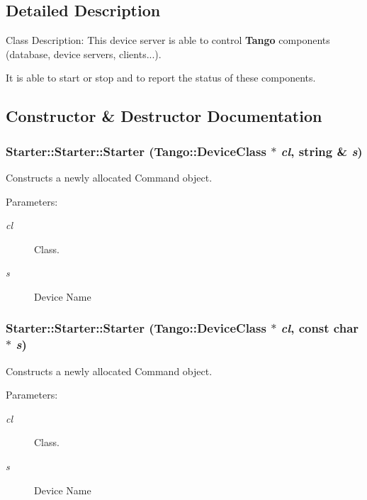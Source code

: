 \subsection{Detailed Description}
Class Description: This device server is able to control {\bf Tango} components (database, device servers, clients...).

It is able to start or stop and to report the status of these components. 



\subsection{Constructor \& Destructor Documentation}
\subsubsection{\setlength{\rightskip}{0pt plus 5cm}Starter::Starter::Starter (Tango::Device\-Class $\ast$ {\em cl}, string \& {\em s})}\label{classStarter_1_1Starter_z2_0}


Constructs a newly allocated Command object.

\begin{Desc}
\item[Parameters: ]\par
\begin{description}
\item[{\em 
cl}]Class. \item[{\em 
s}]Device Name \end{description}
\end{Desc}
\subsubsection{\setlength{\rightskip}{0pt plus 5cm}Starter::Starter::Starter (Tango::Device\-Class $\ast$ {\em cl}, const char $\ast$ {\em s})}\label{classStarter_1_1Starter_z2_1}


Constructs a newly allocated Command object.

\begin{Desc}
\item[Parameters: ]\par
\begin{description}
\item[{\em 
cl}]Class. \item[{\em 
s}]Device Name \end{description}
\end{Desc}
